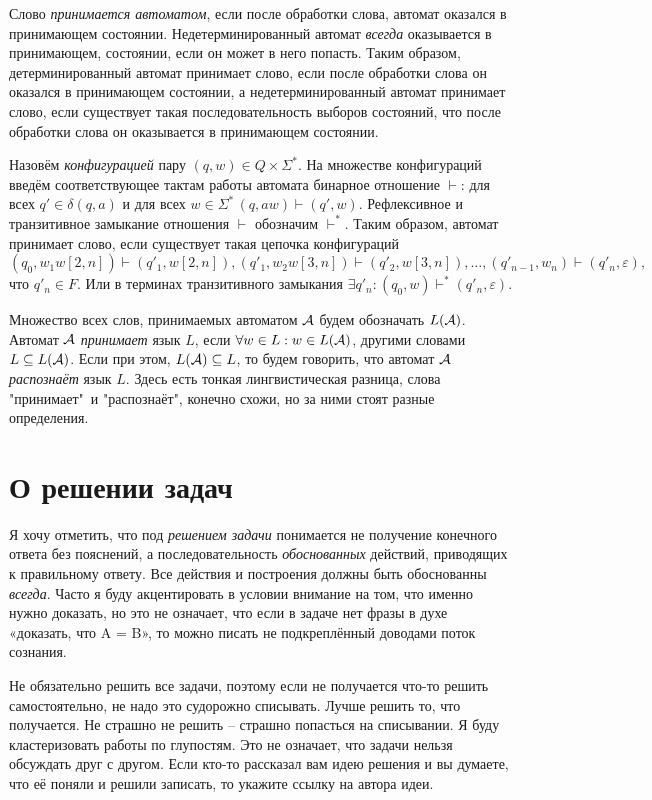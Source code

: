 \documentclass[12pt]{article}
\theoremstyle{definiton}
\theoremstyle{definition}
\theoremstyle{definition}
\let\eps\varepsilon
\def\A{{\cal A}}
\begin{document}
	Слово \emph{принимается автоматом}, если после обработки слова, автомат оказался в принимающем состоянии. Недетерминированный автомат \emph{всегда} оказывается в принимающем, состоянии, если он может в него попасть. 
	Таким образом, детерминированный автомат принимает слово, если после обработки слова он оказался в принимающем состоянии, а недетерминированный автомат принимает слово, если существует такая последовательность выборов состояний, что после обработки слова он оказывается в принимающем состоянии. 

	Назовём {\em конфигурацией} пару $(q,w) \in Q \times \Sigma^*$. На множестве конфигураций введём соответствующее тактам работы автомата бинарное отношение $\vdash$:  для всех $q' \in \delta(q,a)$ и для всех $w \in \Sigma^* \, (q,aw) \vdash (q',w)$. Рефлексивное и транзитивное замыкание отношения $\vdash$ обозначим $\vdash^*$. Таким образом, автомат принимает слово, если существует такая цепочка конфигураций \[(q_0, w_1w[2,n]) \vdash (q'_1, w[2,n]), (q'_1, w_2w[3,n]) \vdash (q'_2, w[3,n]),\ldots, (q'_{n-1},w_n) \vdash (q'_n,\eps), \]
	что $q'_n \in F$. Или в терминах транзитивного замыкания $\exists q'_n: (q_0, w) \vdash^* (q'_n, \eps)$.

	Множество всех слов, принимаемых автоматом $\A$ будем обозначать $L(\A)$. Автомат $\A$  \emph{принимает} язык $L$, если $\forall w \in L : w \in L(\A)  $, другими словами $L \subseteq L(\A)$. Если при этом, $L(\A) \subseteq L$, то будем говорить, что автомат $\A$ \emph{распознаёт} язык $L$. Здесь есть тонкая лингвистическая разница,  слова "принимает"\  и "распознаёт", конечно схожи, но за ними стоят разные определения. 

\section{О решении задач}

	Я хочу отметить, что под \emph{решением задачи} понимается не получение конечного ответа без пояснений, а последовательность \emph{обоснованных} действий, приводящих к правильному ответу. Все действия и построения должны быть обоснованны \emph{всегда}. Часто я буду акцентировать в условии внимание на том, что именно нужно доказать, но это не означает, что если в задаче нет фразы в духе «доказать, что A = B», то можно писать не подкреплённый доводами поток сознания.
	
	
	Не обязательно решить все задачи, поэтому если не получается что-то решить самостоятельно, не надо это судорожно списывать. Лучше решить то, что получается. Не страшно не решить -- страшно попасться на списывании. Я буду кластеризовать работы по глупостям. Это не означает, что задачи нельзя обсуждать друг с другом. Если кто-то рассказал вам идею решения и вы думаете, что её поняли и решили записать, то укажите ссылку на автора идеи.
\end{document}
